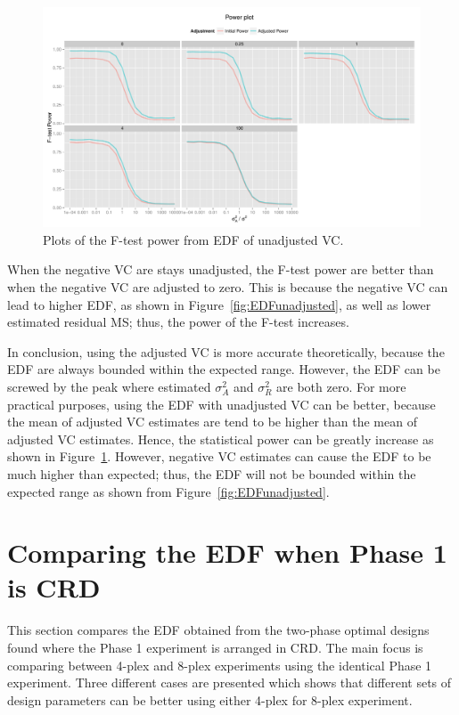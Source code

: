 \documentclass[12pt,a4paper]{article}
\begin{document}
\begin{figure}[ht]
\centering
\includegraphics[width=1 \textwidth]{Graph/remainNegPowerEDF.pdf}
\caption{Plots of the F-test power from EDF of unadjusted VC.}
\label{fig:PowerUnadjusted}
\end{figure}

When the negative VC are stays unadjusted, the F-test power are better than when the negative VC are adjusted to zero. This is because the negative VC can lead to higher EDF, as shown in Figure~\ref{fig:EDFunadjusted}, as well as lower estimated residual MS; thus, the power of the F-test increases. 

In conclusion, using the adjusted VC is more accurate theoretically, because the EDF are always bounded within the expected range. However, the EDF can be screwed by the peak where estimated $\sigma_A^2$ and $\sigma_R^2$ are both zero. For more practical purposes, using the EDF with unadjusted VC can be better, because the mean of adjusted VC estimates are tend to be higher than the mean of adjusted VC estimates. Hence, the statistical power can be greatly increase as shown in Figure~\ref{fig:PowerUnadjusted}. However, negative VC estimates can cause the EDF to be much higher than expected; thus, the EDF will not be bounded within the expected range as shown from Figure~\ref{fig:EDFunadjusted}.
  
\section{Comparing the EDF when Phase 1 is CRD}
This section compares the EDF obtained from the two-phase optimal designs found where the Phase 1 experiment is arranged in CRD. The main focus is comparing between 4-plex and 8-plex experiments using the identical Phase 1 experiment. Three different cases are presented which shows that different sets of design parameters can be better using either 4-plex for 8-plex experiment.
\end{document}
